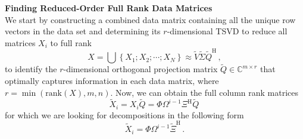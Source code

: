 \documentclass[10pt]{article}
\begin{document}
\noindent\textbf{Finding Reduced-Order Full Rank Data Matrices}\\
We start by constructing a combined data matrix containing all the unique row vectors in the data set and determining its $r$-dimensional TSVD to reduce all matrices $X_i$ to full rank
\begin{equation}
    X = \bigcup \left\{X_1; X_2; \cdots; X_N\right\}
    \approx  \tilde V \tilde \Sigma  \tilde Q^\mathrm{H}\,,
\end{equation}
to identify the $r$-dimensional orthogonal projection matrix $\tilde Q\in \mathbb{C}^{m\times r}$ that optimally captures information in each data matrix, where $r = \min\left(\mathrm{rank}(X),m,n\right)$.
Now, we can obtain the full column rank matrices
\begin{equation}
    \tilde X_i = X_i \tilde Q = \Phi \Omega^{i-1}\Xi^\mathrm{H}\tilde Q\,
\end{equation}
for which we are  looking for decompositions in the following form
\begin{equation}\label{dmdgsvd}
    \tilde X_i %
    = \Phi \Omega^{i-1} \tilde \Xi^\mathrm{H}\,.
\end{equation}\\
\end{document}
